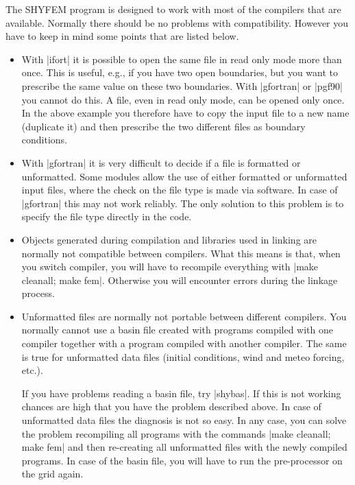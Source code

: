 
The SHYFEM program is designed to work with most of the compilers
that are available. Normally there should be no problems with
compatibility. However you have to keep in mind some points that are
listed below.

\begin{itemize}

\item With |ifort| it is possible to open the same file in
read only mode more than once. This is useful, e.g., if you have two
open boundaries, but you want to prescribe the same value on these
two boundaries. With |gfortran| or |pgf90| you cannot do this. A file,
even in read only mode, can be opened only once. In the above example
you therefore have to copy the input file to a new name (duplicate it)
and then prescribe the two different files as boundary conditions.

\item With |gfortran| it is very difficult to decide if a file is
formatted or unformatted. Some modules allow the use of either formatted
or unformatted input files, where the check on the file type is made
via software. In case of |gfortran| this may not work reliably. The only
solution to this problem is to specify the file type directly in the code.

\item Objects generated during compilation and libraries used in linking
are normally not compatible between compilers. What this means is that,
when you switch compiler, you will have to recompile everything with
|make cleanall; make fem|. Otherwise you will encounter errors during
the linkage process.

\item Unformatted files are normally not portable between different
compilers. You normally cannot use a basin file created with programs
compiled with one compiler together with a program compiled with another
compiler. The same is true for unformatted data files (initial conditions,
wind and meteo forcing, etc.).

If you have problems reading a basin file, try |shybas|. If this is
not working chances are high that you have the problem described above.
In case of unformatted data files the diagnosis is not so easy. In any
case, you can solve the problem recompiling all programs with the commands
|make cleanall; make fem| and then re-creating all unformatted files
with the newly compiled programs. In case of the basin file, you will
have to run the pre-processor on the grid again.


\end{itemize}
